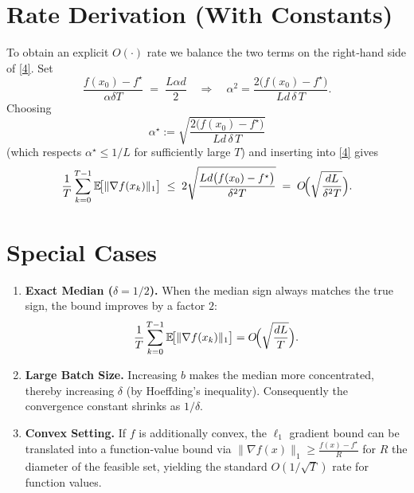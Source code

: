 \documentclass{article}
\newcommand{\E}{\mathbb{E}}
\begin{document}
\section*{Rate Derivation (With Constants)}
To obtain an explicit $O(\cdot)$ rate we balance the two terms on the right‑hand side of \eqref{4}. Set
\[
\frac{f(x_{0})-f^{\star}}{\alpha\delta T}
\;=\;
\frac{L\alpha d}{2}
\quad\Longrightarrow\quad
\alpha^{2}
=\frac{2\bigl(f(x_{0})-f^{\star}\bigr)}{L d\,\delta\,T}.
\]
Choosing
\[
\alpha^{\star}
:=\sqrt{\frac{2\bigl(f(x_{0})-f^{\star}\bigr)}{L d\,\delta\,T}}
\]
(which respects $\alpha^{\star}\le 1/L$ for sufficiently large $T$) and inserting into \eqref{4} gives
\[
\frac{1}{T}\sum_{k=0}^{T-1}\E\!\bigl[\|\nabla f(x_{k})\|_{1}\bigr]
\;\le\;
2\sqrt{\frac{L d\bigl(f(x_{0})-f^{\star}\bigr)}{\delta^{2}T}}
\;=\;
O\!\Bigl(\sqrt{\frac{dL}{\delta^{2}T}}\Bigr).
\]

\section*{Special Cases}
\begin{enumerate}
\item \textbf{Exact Median ($\delta=1/2$).} When the median sign always matches the true sign, the bound improves by a factor $2$:
\[
\frac{1}{T}\sum_{k=0}^{T-1}\E\!\bigl[\|\nabla f(x_{k})\|_{1}\bigr]
=O\!\Bigl(\sqrt{\frac{dL}{T}}\Bigr).
\]

\item \textbf{Large Batch Size.} Increasing $b$ makes the median more concentrated, thereby increasing $\delta$ (by Hoeffding’s inequality). Consequently the convergence constant shrinks as $1/\delta$.

\item \textbf{Convex Setting.} If $f$ is additionally convex, the $\ell_{1}$ gradient bound can be translated into a function‑value bound via
$\|\nabla f(x)\|_{1}\ge \frac{f(x)-f^{\star}}{R}$ for $R$ the diameter of the feasible set, yielding the standard $O(1/\sqrt{T})$ rate for function values.
\end{enumerate}
\end{document}
